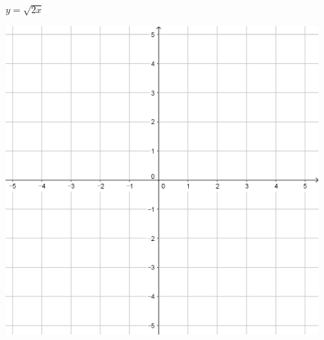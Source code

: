 \documentclass[a4paper]{oblivoir}
\begin{document}
\begin{minipage}{0.45\textwidth}\centering
\(y=\sqrt{2x}\)
\par\bigskip\includegraphics[width=0.9\textwidth]{55}
\end{minipage}\bigskip\bigskip\par
\end{document}
